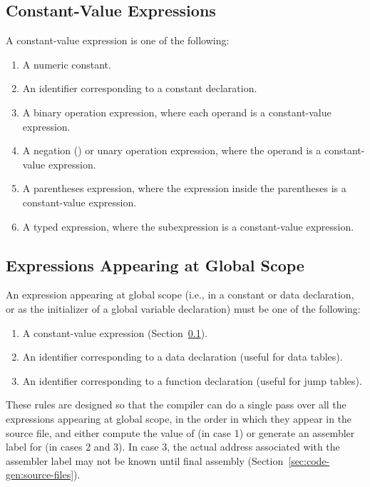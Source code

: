 \documentclass[10pt]{article}
\begin{document}
\subsection{Constant-Value Expressions}
\label{sec:semantics:constant-value-expr}

A constant-value expression is one of the following:
%
\begin{enumerate}
%
\item A numeric constant.
%
\item An identifier corresponding to a constant declaration.
%
\item A binary operation expression, where each operand is a
  constant-value expression.
%
\item A negation (\kwd{-}) or  unary operation expression,
  where the operand is a constant-value expression.
%
\item A parentheses expression, where the expression inside the
  parentheses is a constant-value expression.
%
\item A typed expression, where the subexpression is a constant-value
  expression.
%
\end{enumerate}

\subsection{Expressions Appearing at Global Scope}
\label{sec:semantic:global-expr}

An expression appearing at global scope (i.e., in a constant or data
declaration, or as the initializer of a global variable declaration)
must be one of the following:
%
\begin{enumerate}
%
\item A constant-value expression
  (Section~\ref{sec:semantics:constant-value-expr}).
%
\item An identifier corresponding to a data declaration (useful for
  data tables).
%
\item An identifier corresponding to a function declaration (useful
  for jump tables).
%
\end{enumerate}

These rules are designed so that the compiler can do a single pass
over all the expressions  appearing at global scope, in
the order in which they appear in the source file, and either compute
the value of  (in case 1) or generate an assembler label
for  (in cases 2 and 3). In case 3, the actual address
associated with the assembler label may not be known until final
assembly (Section~\ref{sec:code-gen:source-files}).
\end{document}
